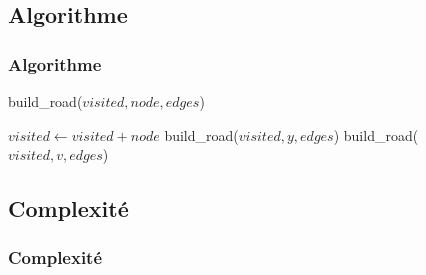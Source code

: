 \documentclass{beamer}
\begin{document}
	\subsection{Algorithme}
		\begin{frame}
			\frametitle{Algorithme}
			
			\begin{algorithm}[H]
				\caption{build\_road($visited, node, edges$)}
				\begin{algorithmic}[H]
					\STATE $visited \leftarrow visited + node$
						\STATE build\_road($visited, y, edges$)
						\ELSE {}
						\STATE build\_road($visited, v, edges$)
						\ENDIF
						\ENDIF
					\ENDFOR
				\end{algorithmic}
			\end{algorithm}
			
			
		\end{frame}

	\subsection{Complexité}
	\begin{frame}
		\frametitle{Complexité}

		
	\end{frame}
\end{document}
